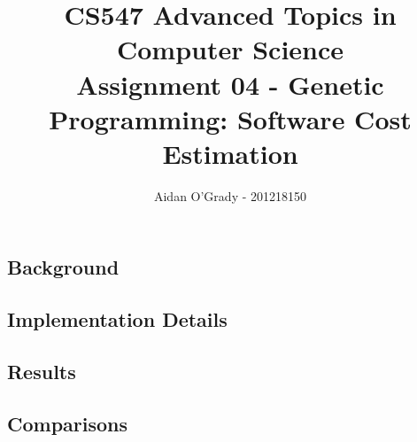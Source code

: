 \documentclass[11pt, a4paper]{article}
\begin{document}
\title{CS547 Advanced Topics in Computer Science\\
\large{Assignment 04 - Genetic Programming: Software Cost Estimation}}
\author{Aidan O'Grady - 201218150}
\date{}
\maketitle
\subsection{Background} %
\label{sub:background}

\subsection{Implementation Details} %
\label{sub:implementation_details}

\subsection{Results} %
\label{sub:results}

\subsection{Comparisons} %
\label{sub:comparisons}
\end{document}
